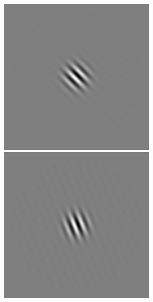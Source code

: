 \begin{figure}[ht]
\begin{center}
 \includegraphics[width=\columnwidth/9]{ch4/figures/rGabor3_6.jpg}
 \includegraphics[width=\columnwidth/9]{ch4/figures/rGabor3_7.jpg}\\

\end{center}
\end{figure}
